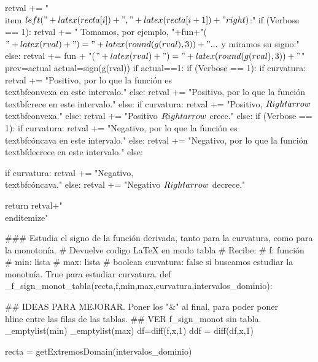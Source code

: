 \begin{sagesilent}
  retval += "\\item $\\left("+latex(recta[i])+","+latex(recta[i+1])+"\\right)$:"
  if (Verbose == 1):
   retval += " Tomamos, por ejemplo, "+fun+"($"+latex(rval)+") = "+latex(round(g(rval),3))+"...$  y miramos su signo:" 
  else:
   retval += fun + "($"+latex(rval)+") = "+latex(round(g(rval),3)) +"$"
  prev=actual
  actual=sign(g(rval))
  if actual==1: 
   if (Verbose == 1):
    if curvatura:
        retval += "Positivo, por lo que la función es \\textbf{convexa} en este intervalo."
    else:
        retval += "Positivo, por lo que la función \\textbf{crece} en este intervalo."  
   else:
    if curvatura:
        retval += "Positivo, $\\Rightarrow$ \\textbf{convexa}."
    else:  
        retval += "Positivo $\\Rightarrow$ crece."
  else:
   if (Verbose == 1):
    if curvatura:
        retval += "Negativo, por lo que la función es \\textbf{cóncava} en este intervalo."
    else:
        retval += "Negativo, por lo que la función \\textbf{decrece} en este intervalo."
   else:

    if curvatura:
        retval += "Negativo, \\textbf{cóncava}."
    else:
        retval += "Negativo $\\Rightarrow$ decrece."


 
 return retval+"\\end{itemize}"
 



### Estudia el signo de la función derivada, tanto para la curvatura, como para la monotonía.
# Devuelve codigo LaTeX en modo tabla
# Recibe:
# f: función
# min: lista
# max: lista
# boolean curvatura: false si buscamos estudiar la monotnía. True para estudiar curvatura.
def _f_sign_monot_tabla(recta,f,min,max,curvatura,intervalos_dominio):

## IDEAS PARA MEJORAR. Poner los "&" al final, para poder poner \\hline entre las filas de las tablas.
## VER f_sign_monot sin tabla.
 _emptylist(min)
 _emptylist(max)
 df=diff(f,x,1)
 ddf = diff(df,x,1)


 recta = getExtremosDomain(intervalos_dominio)
  

\end{sagesilent}
